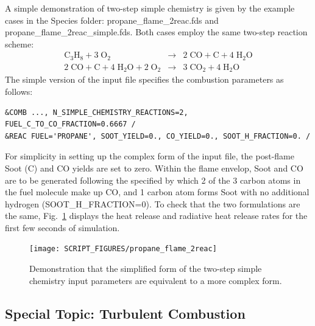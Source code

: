 \documentclass[11pt]{book}
\begin{document}
A simple demonstration of two-step simple chemistry is given by the example cases in the {\ct Species} folder: {\ct propane\_flame\_2reac.fds} and {\ct propane\_flame\_2reac\_simple.fds}. Both cases employ the same two-step reaction scheme:
\begin{eqnarray}
   \mathrm{C_3H_8} + 3 \; \mathrm{O_2} & \longrightarrow & 2 \; \mathrm{CO} + \mathrm{C} + 4 \; \mathrm{H_2O} \\
   2 \; \mathrm{CO} + \mathrm{C} + 4 \; \mathrm{H_2O} + 2 \; \mathrm{O_2} & \longrightarrow & 3 \; \mathrm{CO_2} + 4 \; \mathrm{H_2O}
\end{eqnarray}
The simple version of the input file specifies the combustion parameters as follows:
\begin{lstlisting}
&COMB ..., N_SIMPLE_CHEMISTRY_REACTIONS=2, FUEL_C_TO_CO_FRACTION=0.6667 /
&REAC FUEL='PROPANE', SOOT_YIELD=0., CO_YIELD=0., SOOT_H_FRACTION=0. /
\end{lstlisting}
For simplicity in setting up the complex form of the input file, the post-flame Soot (C) and CO yields are set to zero. Within the flame envelop, Soot and CO are to be generated following the specified  by which 2 of the 3 carbon atoms in the fuel molecule make up CO, and 1 carbon atom forms Soot with no additional hydrogen ({\ct SOOT\_H\_FRACTION=0}). To check that the two formulations are the same, Fig.~\ref{fig:propane_flame_2reac} displays the heat release and radiative heat release rates for the first few seconds of simulation.
\begin{figure}[!ht]
\begin{center}
\texttt{[image: SCRIPT\_FIGURES/propane\_flame\_2reac]}
\end{center}
\caption[Results of the {\ct propane\_flame\_2reac} test cases]{Demonstration that the simplified form of the two-step simple chemistry input parameters are equivalent to a more complex form.}
\label{fig:propane_flame_2reac}
\end{figure}



\subsection{Special Topic: Turbulent Combustion}

\label{info:turbulent_combustion}
\end{document}
